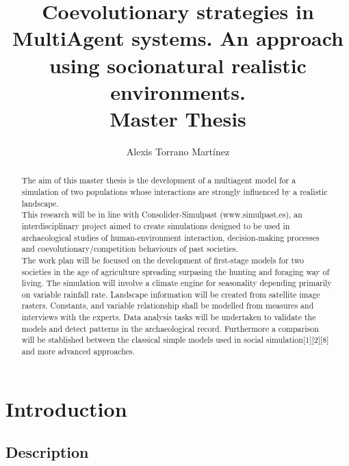 \documentclass[11pt,oneside,a4paper,openright]{report}
\begin{document}
\title{Coevolutionary strategies in MultiAgent systems. An approach using socionatural realistic environments.\\
\small{Master Thesis}}
\author{Alexis Torrano Mart\'inez}
\maketitle
\newpage



\begin{abstract}
The aim of this master thesis is the development of a multiagent model for a simulation of two populations whose interactions are strongly influenced by a realistic landscape.\\
This research will be in line with Consolider-Simulpast (www.simulpast.es), an interdisciplinary project aimed to create simulations designed to be used in archaeological studies of human-environment interaction, decision-making processes and coevolutionary/competition behaviours of past societies.\\
The work plan will be focused on the development of first-stage models for two societies in the age of agriculture spreading surpasing the hunting and foraging way of living. The simulation will involve a climate engine for seasonality depending primarily on variable rainfall rate. Landscape information will be created from satellite image rasters. Constants, and variable relationship shall be modelled from measures and interviews with the experts. Data analysis tasks will be undertaken to validate the models and detect patterns in the archaeological record. Furthermore a comparison will be stablished between the classical simple models used in social simulation[1][2][8] and more advanced approaches.
\end{abstract}
\newpage 

\setcounter{tocdepth}{6}
\tableofcontents
\newpage 

\chapter{Introduction}

\section{Description}
\end{document}
